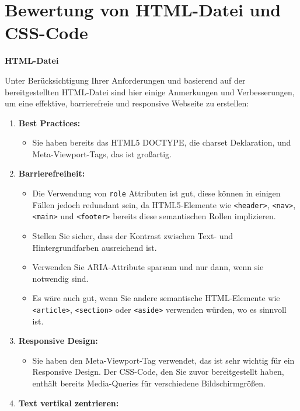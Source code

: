 \documentclass[12pt,a4paper]{scrartcl}
\newcommand{\tightlist}{
  \setlength{\itemsep}{0pt}\setlength{\parskip}{0pt}
}
\begin{document}
\hypertarget{bewertung-von-html-datei-und-css-code}{%
\section{Bewertung von HTML-Datei und
CSS-Code}\label{bewertung-von-html-datei-und-css-code}}

\textbf{HTML-Datei}

Unter Berücksichtigung Ihrer Anforderungen und basierend auf der
bereitgestellten HTML-Datei sind hier einige Anmerkungen und
Verbesserungen, um eine effektive, barrierefreie und responsive Webseite
zu erstellen:

\begin{enumerate}
\def\labelenumi{\arabic{enumi}.}
\tightlist
\item
  \textbf{Best Practices:}

  \begin{itemize}
  \tightlist
  \item
    Sie haben bereits das HTML5 DOCTYPE, die charset Deklaration, und
    Meta-Viewport-Tags, das ist großartig.
  \end{itemize}
\item
  \textbf{Barrierefreiheit:}

  \begin{itemize}
  \tightlist
  \item
    Die Verwendung von {\lstinline!role!} Attributen ist
    gut, diese können in einigen Fällen jedoch redundant sein, da
    HTML5-Elemente wie {\lstinline!<header>!},
    {\lstinline!<nav>!}, {\lstinline!<main>!}
    und {\lstinline!<footer>!} bereits diese semantischen
    Rollen implizieren.
  \item
    Stellen Sie sicher, dass der Kontrast zwischen Text- und
    Hintergrundfarben ausreichend ist.
  \item
    Verwenden Sie ARIA-Attribute sparsam und nur dann, wenn sie
    notwendig sind.
  \item
    Es wäre auch gut, wenn Sie andere semantische HTML-Elemente wie
    {\lstinline!<article>!},
    {\lstinline!<section>!} oder
    {\lstinline!<aside>!} verwenden würden, wo es sinnvoll
    ist.
  \end{itemize}
\item
  \textbf{Responsive Design:}

  \begin{itemize}
  \tightlist
  \item
    Sie haben den Meta-Viewport-Tag verwendet, das ist sehr wichtig für
    ein Responsive Design. Der CSS-Code, den Sie zuvor bereitgestellt
    haben, enthält bereits Media-Queries für verschiedene
    Bildschirmgrößen.
  \end{itemize}
\item
  \textbf{Text vertikal zentrieren:}


\end{enumerate}
\end{document}
